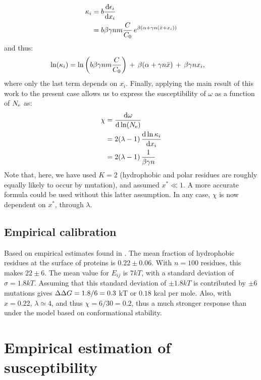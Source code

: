 \documentclass{article}
\begin{document}
\begin{align}
    \kappa_i & = b \frac{\mathrm{d}\epsilon_i} {\mathrm{d} x_i}
    \\ & =
    b \beta \gamma n m \frac{C}{C_0} \, e^{\beta (\alpha +\gamma n (\bar x + x_i))}
\end{align}
and thus:
\begin{align}
    \ln (\kappa_i) & = \ln \left( b \beta \gamma n m \frac{C}{C_0}  \right) \, + \, \beta (\alpha +\gamma n \bar x) \, + \, \beta \gamma n x_i,
\end{align}
where only the last term depends on $x_i$.
Finally, applying the main result of this work to the present case allows us to express the susceptibility of $\omega$ as a function of $N_{\text{e}}$ as:
\begin{align}
    \chi & = \frac{\mathrm{d}\omega} {\mathrm{d} \ln (N_{\text{e}})}
    \\ & =  2(\lambda - 1) \, \frac{\mathrm{d}\ln \kappa_i}{\mathrm{d} x_i}
    \\ & =  2 (\lambda - 1) \, \frac{1}{\beta \gamma n}
\end{align}
Note that, here, we have used $K=2$ (hydrophobic and polar residues are roughly equally likely to occur by mutation), and assumed $x^* \ll 1$.
A more accurate formula could be used without this latter assumption.
In any case, $\chi$ is now dependent on $x^*$, through $\lambda$.

\subsection{Empirical calibration}
\label{subsec:empirical-calibration}

Based on empirical estimates found in \citet{Zhang2008}.
The mean fraction of hydrophobic residues at the surface of proteins is $0.22 \pm 0.06$. With $n=100$ residues, this makes $22 \pm 6$.
The mean value for $E_{ij}$ is $7kT$, with a standard deviation of $\sigma = 1.8kT$.
Assuming that this standard deviation of $\pm 1.8kT$ is contributed by $\pm 6$ mutations gives $\Delta \Delta G = 1.8 / 6 = 0.3$ kT or $0.18$ kcal per mole.
Also, with $x=0.22$, $\lambda \simeq 4$, and thus $\chi = 6 / 30 = 0.2$, thus a much stronger response than under the model based on conformational stability.


\section{Empirical estimation of susceptibility}
\label{sec:empirical-estimation-of-susceptibility}
\end{document}
